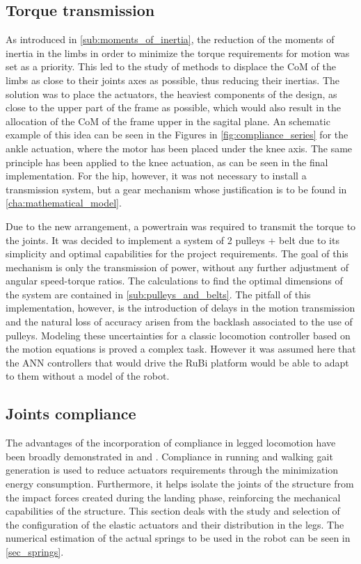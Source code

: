 
\subsection{Torque transmission} %
\label{sub:transmission}
As introduced in \ref{sub:moments_of_inertia}, the reduction of the moments of inertia in the limbs in order to minimize the torque requirements for motion was set as a priority.
This led to the study of methods to displace the CoM of the limbs as close to their joints axes as possible, thus reducing their inertias.
The solution was to place the actuators, the heaviest components of the design, as close to the upper part of the frame as possible, which would also result in the allocation of the CoM of the frame upper in the sagital plane.
An schematic example of this idea can be seen in the Figures in \ref{fig:compliance_series} for the ankle actuation, where the motor has been placed under the knee axis. 
The same principle has been applied to the knee actuation, as can be seen in the final implementation. 
For the hip, however, it was not necessary to install a transmission system, but a gear mechanism whose justification is to be found in \ref{cha:mathematical_model}.

Due to the new arrangement, a powertrain was required to transmit the torque to the joints.
It was decided to implement a system of 2 pulleys + belt due to its simplicity and optimal capabilities for the project requirements.
The goal of this mechanism is only the transmission of power, without any further adjustment of angular speed-torque ratios.
The calculations to find the optimal dimensions of the system are contained in \ref{sub:pulleys_and_belts}.
The pitfall of this implementation, however, is the introduction of delays in the motion transmission and the natural loss of accuracy arisen from the backlash associated to the use of pulleys.
Modeling these uncertainties for a classic locomotion controller based on the motion equations is proved a complex task. 
However it was assumed here that the ANN controllers that would drive the RuBi platform would be able to adapt to them without a model of the robot.


\subsection{Joints compliance} %
\label{sub:compliance}
The advantages of the incorporation of compliance in legged locomotion have been broadly demonstrated in \cite{compliance_thesis} and \cite{grimmer}.
Compliance in running and walking gait generation is used to reduce actuators requirements through the minimization energy consumption.
Furthermore, it helps isolate the joints of the structure from the impact forces created during the landing phase, reinforcing the mechanical capabilities of the structure.
This section deals with the study and selection of the configuration of the elastic actuators and their distribution in the legs.
The numerical estimation of the actual springs to be used in the robot can be seen in \ref{sec_springs}.

